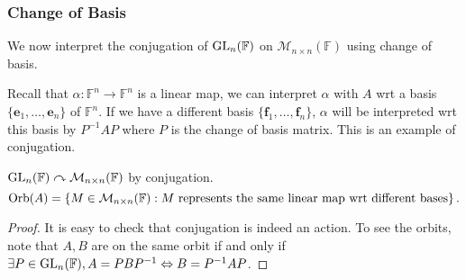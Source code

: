 \documentclass[a4paper]{article}
\begin{document}
\subsubsection{Change of Basis}
We now interpret the conjugation of $ \mathrm{GL}_n(\mathbb{F}) $ on $
\mathcal{M}_{n\times n}(\mathbb{F}) $ using change of basis.

Recall that $ \alpha: \mathbb{F}^n \to \mathbb{F}^n $ is a linear
map, we can interpret $\alpha$ with $A$ wrt a basis $
\{\mathbf{e}_1,\dots,\mathbf{e}_n\} $ of $ \mathbb{F}^n $. If we have
a different basis $ \{\mathbf{f}_1,\dots,\mathbf{f}_n\} $, $\alpha$
will be interpreted wrt this basis by $ P^{-1}AP $ where $P$ is the
change of basis matrix. This is an example of conjugation.
\begin{proposition}\label{prop:7.9}
  $ \mathrm{GL}_n(\mathbb{F}) \curvearrowright \mathcal{M}_{n\times
  n}(\mathbb{F}) $ by conjugation.
  \[
    \operatorname{Orb}(A)=\left\{ M\in \mathcal{M}_{n\times n}(\mathbb{F}): M
    \text{ represents the same linear map wrt different bases} \right\}.
  \]
\end{proposition}
\begin{proof}
  It is easy to check that conjugation is indeed an action. To see
  the orbits, note that $ A,B $ are on the same orbit if and only if
  $ \exists P\in \mathrm{GL}_n(\mathbb{F}), A = PBP^{-1} \Leftrightarrow B=P^{-1}AP $.
\end{proof}
\end{document}
